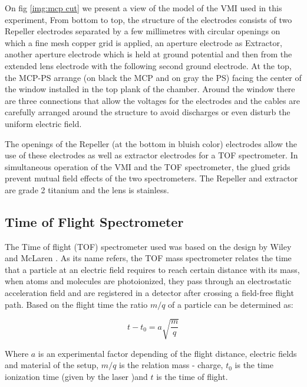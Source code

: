 On fig \ref{img:mcp cut} we present a view of the model of the VMI used in this experiment, From bottom to top, the structure of the electrodes consists of two Repeller electrodes separated by a few millimetres with circular openings on which a fine mesh copper grid is applied, an aperture electrode as Extractor, another aperture electrode which is held at ground potential and then from the extended lens electrode with the following second ground electrode. At the top, the MCP-PS arrange (on black the MCP and on gray the PS) facing the center of the window installed in the top plank of the chamber. Around the window there are three connections that allow the voltages for the electrodes and the cables are carefully arranged around the structure to avoid discharges or even disturb the uniform electric field.

The openings of the Repeller (at the bottom in bluish color) electrodes allow the use of these electrodes as well as extractor electrodes for a TOF spectrometer. In simultaneous operation of the VMI and the TOF spectrometer, the glued grids prevent mutual field effects of the two spectrometers.  The Repeller and extractor are grade 2 titanium and the lens is stainless.

\subsection{Time of Flight Spectrometer}

The Time of flight (TOF) spectrometer used was based on the design by Wiley and McLaren \cite{wiley_timeflight_1955}. As its name refers, the TOF mass spectrometer relates the time that a particle at an electric field requires to reach certain distance with its mass, when atoms and molecules are photoionized,  they pass through an electrostatic acceleration field and are registered in a detector after crossing a field-free flight path. Based on the flight time the ratio $m/q$ of a particle can be determined as:

\begin{equation}
t-t_{0}=a\sqrt{\frac{m}{q}}
\end{equation}

Where $a$ is an experimental factor depending of the flight distance, electric fields and material of the setup,  $m/q$ is the relation mass - charge, $t_{0}$ is the time ionization time (given by the laser )and $t$ is the time of flight.

